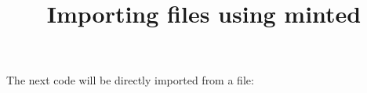 \documentclass{article}
\title{Importing files using minted}
\begin{document}
	The next code will be directly imported from a file:
	
	\inputminted{octave}{BitXorMatrix.m}
\end{document}

